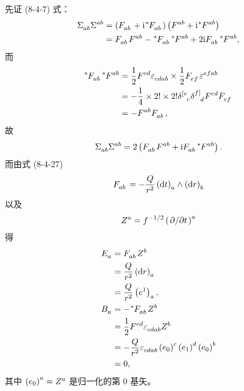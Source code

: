\begin{xiti}
	\begin{zm}
		先证 (8-4-7) 式：
		\begin{equation*}
			\begin{split}
				\tensor{\Sigma}{_a_b} \tensor{\Sigma}{^a^b} &= \left( \tensor{F}{_a_b} + \ii \tensor[^*]{F}{_a_b} \right) \left( \tensor{F}{^a^b} + \ii \tensor[^*]{F}{^a^b} \right)\\
				&= \tensor{F}{_a_b} \tensor{F}{^a^b} - \tensor[^*]{F}{_a_b} \tensor[^*]{F}{^a^b} + 2\ii \tensor{F}{_a_b} \tensor[^*]{F}{^a^b},
			\end{split}
		\end{equation*}
		而
		\begin{equation}
			\begin{split}
				\tensor[^*]{F}{_a_b} \tensor[^*]{F}{^a^b} &= \frac{1}{2} \tensor{F}{^c^d} \tensor{\varepsilon}{_c_d_a_b} \times \frac{1}{2} \tensor{F}{_e_f} \tensor{\varepsilon}{^e^f^a^b}\\
				&= - \frac{1}{4} \times 2! \times 2! \tensor{\delta}{^{[e}_c} \tensor{\delta}{^{f]}_d} \tensor{F}{^c^d} \tensor{F}{_e_f}\\
				&= - \tensor{F}{^a^b} \tensor{F}{_a_b},
			\end{split}\label{eq-F*F*}
		\end{equation}
		故
		\begin{equation}
			\begin{split}
				\tensor{\Sigma}{_a_b} \tensor{\Sigma}{^a^b} = 2 \left( \tensor{F}{_a_b} \tensor{F}{^a^b} + \ii \tensor{F}{_a_b} \tensor[^*]{F}{^a^b} \right).\label{eq-SS}
			\end{split}
		\end{equation}
		而由式 (8-4-27) 
		\begin{equation*}
			\tensor{F}{_a_b} = - \frac{Q}{r^2} \tensor{\left( \dd{t} \right)}{_a} \wedge \tensor{\left( \dd{r} \right)}{_b}
		\end{equation*}
		以及
		\begin{equation*}
			\tensor{Z}{^a} = f^{-1/2} \tensor{\left( \pdv*{t} \right)}{^a}
		\end{equation*}
		得
		\begin{equation*}
			\begin{split}
				\tensor{E}{_a} &= \tensor{F}{_a_b} \tensor{Z}{^b}\\
				&= \frac{Q}{r^2} \tensor{\left( \dd{r} \right)}{_a}\\
				&= \frac{Q}{r^2} \tensor{\left( e^1 \right)}{_a},\\
				\tensor{B}{_a} &= - \tensor[^*]{F}{_a_b} \tensor{Z}{^b}\\
				&= \frac{1}{2} \tensor{F}{^c^d} \tensor{\varepsilon}{_c_d_a_b} \tensor{Z}{^b}\\
				&= - \frac{Q}{r^2} \tensor{\varepsilon}{_c_d_a_b} \tensor{\left( e_0 \right)}{^c} \tensor{\left( e_1 \right)}{^d} \tensor{\left( e_0 \right)}{^b}\\
				&= 0,
			\end{split}
		\end{equation*}
		其中 $\tensor{\left( e_0 \right)}{^a} = \tensor{Z}{^a}$ 是归一化的第 0 基矢。
	\end{zm}


\end{xiti}
